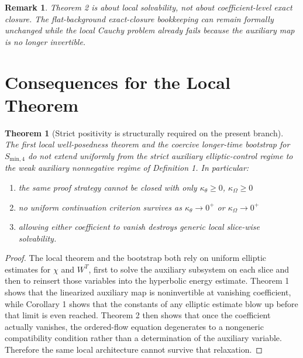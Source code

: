 \documentclass[11pt]{article}
\newtheorem{remark}{Remark}
\newtheorem{theorem}{Theorem}
\begin{document}
\begin{remark}
Theorem 2 is about local solvability, not about coefficient-level exact closure. The flat-background exact-closure bookkeeping can remain formally unchanged while the local Cauchy problem already fails because the auxiliary map is no longer invertible.
\end{remark}

\section{Consequences for the Local Theorem}

\begin{theorem}[Strict positivity is structurally required on the present branch]
The first local well-posedness theorem and the coercive longer-time bootstrap for \(S_{\mathrm{min},4}\) do not extend uniformly from the strict auxiliary elliptic-control regime to the weak auxiliary nonnegative regime of Definition 1. In particular:
\begin{enumerate}
    \item the same proof strategy cannot be closed with only \(\kappa_\theta\ge 0\), \(\kappa_\Omega\ge 0\)
    \item no uniform continuation criterion survives as \(\kappa_\theta\to 0^+\) or \(\kappa_\Omega\to 0^+\)
    \item allowing either coefficient to vanish destroys generic local slice-wise solvability.
\end{enumerate}
\end{theorem}

\begin{proof}
The local theorem and the bootstrap both rely on uniform elliptic estimates for \(\chi\) and \(W^T\), first to solve the auxiliary subsystem on each slice and then to reinsert those variables into the hyperbolic energy estimate. Theorem 1 shows that the linearized auxiliary map is noninvertible at vanishing coefficient, while Corollary 1 shows that the constants of any elliptic estimate blow up before that limit is even reached. Theorem 2 then shows that once the coefficient actually vanishes, the ordered-flow equation degenerates to a nongeneric compatibility condition rather than a determination of the auxiliary variable. Therefore the same local architecture cannot survive that relaxation.
\end{proof}
\end{document}
